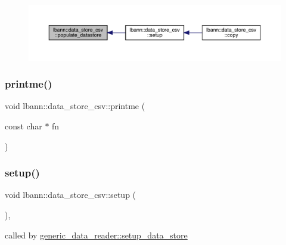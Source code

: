 \begin{figure}[H]
\begin{center}
\leavevmode
\includegraphics[width=350pt]{classlbann_1_1data__store__csv_a6184c48ec096372899e127235bb741da_icgraph}
\end{center}
\end{figure}
\mbox{\label{classlbann_1_1data__store__csv_afe48c08075e3327a2b9bb14c73a9c952}} 
\subsubsection{\texorpdfstring{printme()}{printme()}}
{\footnotesize\ttfamily void lbann\+::data\+\_\+store\+\_\+csv\+::printme (\begin{DoxyParamCaption}\item[{const char $\ast$}]{fn }\end{DoxyParamCaption})\hspace{0.3cm}{\ttfamily [protected]}}

\mbox{\label{classlbann_1_1data__store__csv_a184c7e6f27c5e07255b9c889ace02407}} 
\subsubsection{\texorpdfstring{setup()}{setup()}}
{\footnotesize\ttfamily void lbann\+::data\+\_\+store\+\_\+csv\+::setup (\begin{DoxyParamCaption}{ }\end{DoxyParamCaption})\hspace{0.3cm}{\ttfamily [override]}, {\ttfamily [virtual]}}



called by \hyperlink{classlbann_1_1generic__data__reader_a8b2a09d38512fc11f1b9d572c89100a7}{generic\+\_\+data\+\_\+reader\+::setup\+\_\+data\+\_\+store} 



